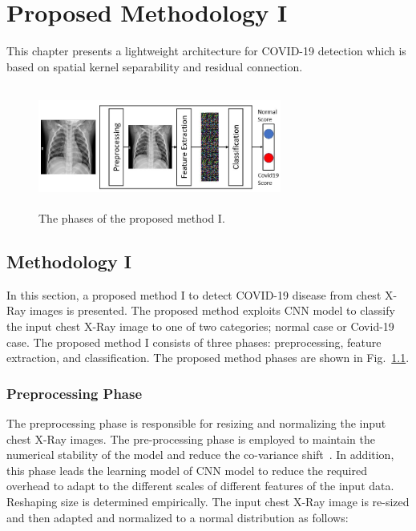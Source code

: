 
\chapter{Proposed Methodology I} %

\label{chp:proposed1} %
This chapter presents a lightweight architecture for COVID-19 detection which is based on spatial kernel separability and residual connection. 

\begin{figure}[th]
    \centering
    \includegraphics[height=40mm,width=8.0cm]{Figures/fig1.jpg}
    \caption{The phases of the proposed method I.}
    \label{fig1}
    \end{figure}

\section{Methodology I}
In this section, a  proposed  method I to detect COVID-19 disease from chest X-Ray images is presented. The proposed method exploits CNN model to classify the input chest X-Ray image to one of two categories; normal case or Covid-19 case. The proposed  method I consists of three phases: preprocessing, feature extraction, and classification. The proposed method phases are shown in Fig.~\ref{fig1}. 

\subsection{Preprocessing Phase}

The preprocessing phase is responsible for resizing and normalizing the  input  chest X-Ray images. The pre-processing phase is employed to maintain the numerical stability of the model and reduce the co-variance shift~\cite{lecun1989handwritten}. In addition, this phase leads the learning model of CNN model to reduce  the required overhead to adapt to the different scales of different features of the input data. Reshaping size is determined empirically. The input chest X-Ray image is re-sized and then adapted and normalized to a normal distribution as follows:

